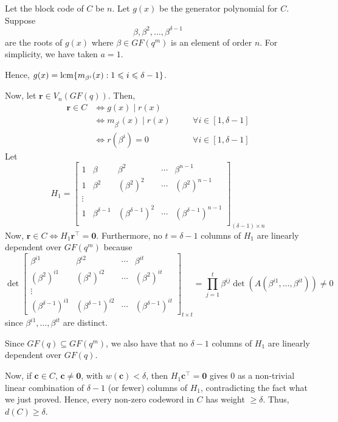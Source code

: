 \begin{Proof}{}{}
    Let the block code of $ C $ be $ n $. Let $ g(x) $ be
    the generator polynomial for $ C $. Suppose
    \[ \beta,\beta^2,\ldots ,\beta^{\delta-1} \]
    are the roots of $ g(x) $ where $ \beta\in GF(q^m) $
    is an element of order $ n $. For simplicity, we have taken
    $ a=1 $.

    Hence, $ g(x)=\operatorname{lcm} \{m_{\beta^i}(x):1\leqslant i\leqslant \delta-1\} $.

    Now, let $ \symbf{r}\in V_n(GF(q)) $. Then,
    \[ \begin{aligned}
            \symbf{r}\in C
             & \iff g(x)\mid r(x)                                              \\
             & \iff m_{\beta^i}(x)\mid r(x) & \quad & \forall i\in[1,\delta-1] \\
             & \iff r(\beta^i)=0            & \quad & \forall i\in[1,\delta-1]
        \end{aligned} \]
    Let
    \[ H_1=
        \begin{bmatrix}
            1 & \beta            & \beta^2              & \cdots & \beta^{n-1}              \\
            1 & \beta^2          & (\beta^2)^2          & \cdots & (\beta^2)^{n-1}          \\
            \vdots                                                                          \\
            1 & \beta^{\delta-1} & (\beta^{\delta-1})^2 & \cdots & (\beta^{\delta-1})^{n-1} \\
        \end{bmatrix}_{(\delta-1)\times n} \]
    Now, $ \symbf{r}\in C\iff H_1\symbf{r}^\top=\symbf{0} $. Furthermore, no $ t=\delta-1 $
    columns of $ H_1 $ are linearly dependent over $ GF(q^m) $
    because
    \[ \det
        \begin{bmatrix}
            \beta^{i1}              & \beta^{i2}              & \cdots & \beta^{it}              \\
            (\beta^2)^{i1}          & (\beta^2)^{i2}          & \cdots & (\beta^2)^{it}          \\
            \vdots                                                                               \\
            (\beta^{\delta-1})^{i1} & (\beta^{\delta-1})^{i2} & \cdots & (\beta^{\delta-1})^{it}
        \end{bmatrix}_{t\times t}=\prod_{j=1}^t\beta^{ij}\det(A(\beta^{i1},\ldots,\beta^{it}))\neq 0 \]
    since $ \beta^{i1},\ldots ,\beta^{it} $ are distinct.

    Since $ GF(q)\subseteq GF(q^m) $, we also have that no $ \delta-1 $ columns
    of $ H_1 $ are linearly dependent over $ GF(q) $.

    Now, if $ \symbf{c}\in C $, $ \symbf{c}\neq \symbf{0} $, with $ w(\symbf{c})<\delta $,
    then $ H_1\symbf{c}^\top=\symbf{0} $ gives $ 0 $ as a non-trivial
    linear combination of $ \delta-1 $ (or fewer) columns of $ H_1 $,
    contradicting the fact what we just proved. Hence, every
    non-zero codeword in $ C $ has weight $ \geqslant \delta $.
    Thus, $ d(C)\geqslant \delta $.
\end{Proof}
